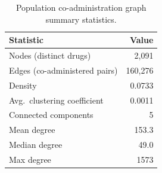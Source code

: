 \begin{table}[t]
\centering
\caption{Population co-administration graph summary statistics.}
\label{tab:graph_stats}
\begin{tabular}{lr}
\toprule
Statistic & Value \\
\midrule
Nodes (distinct drugs) & 2,091 \\
Edges (co-administered pairs) & 160,276 \\
Density & 0.0733 \\
Avg.\ clustering coefficient & 0.0011 \\
Connected components & 5 \\
Mean degree & 153.3 \\
Median degree & 49.0 \\
Max degree & 1573 \\
\bottomrule
\end{tabular}
\end{table}
